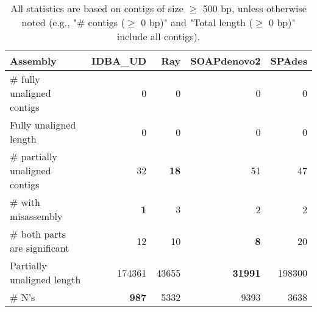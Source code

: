 \documentclass[12pt,a4paper]{article}
\begin{document}
\begin{table}[ht]
\begin{center}
\caption{All statistics are based on contigs of size $\geq$ 500 bp, unless otherwise noted (e.g., "\# contigs ($\geq$ 0 bp)" and "Total length ($\geq$ 0 bp)" include all contigs).}
\begin{tabular}{|l*{4}{|r}|}
\hline
Assembly & IDBA\_UD & Ray & SOAPdenovo2 & SPAdes \\ \hline
\# fully unaligned contigs & 0 & 0 & 0 & 0 \\ \hline
Fully unaligned length & 0 & 0 & 0 & 0 \\ \hline
\# partially unaligned contigs & 32 & {\bf 18} & 51 & 47 \\ \hline
\hspace{5mm}\# with misassembly & {\bf 1} & 3 & 2 & 2 \\ \hline
\hspace{5mm}\# both parts are significant & 12 & 10 & {\bf 8} & 20 \\ \hline
Partially unaligned length & 174361 & 43655 & {\bf 31991} & 198300 \\ \hline
\# N's & {\bf 987} & 5332 & 9393 & 3638 \\ \hline
\end{tabular}
\end{center}
\end{table}
\end{document}
